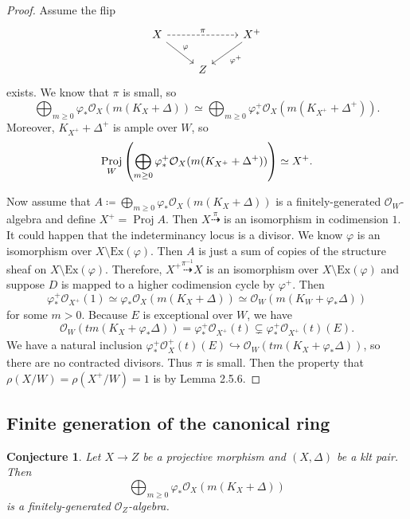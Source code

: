 \documentclass[leqno, openany]{memoir}
\newtheorem{conj}[thm]{Conjecture}
\theoremstyle{definition}
\theoremstyle{remark}
\theoremstyle{plain}
\theoremstyle{definition}
\theoremstyle{remark}
\newcommand{\mc}[1]{\mathcal{#1}}
\newcommand{\mr}[1]{\mathrm{#1}}
\DeclareMathOperator{\Proj}{Proj}
\begin{document}
\begin{proof}
    Assume the flip
    \begin{equation*}
    \begin{tikzcd}
        X \ar[dashrightarrow]{rr}{\pi} \ar{dr}{\varphi} & & X^+ \ar{dl}{\varphi^+} \\
                                                        & Z
    \end{tikzcd}
    \end{equation*}
    exists. We know that $\pi$ is small, so
    \[ \bigoplus_{m \geq 0} \varphi_* \mc{O}_X(m(K_X + \Delta)) \simeq \bigoplus_{m \geq 0} \varphi^+_* \mc{O}_X(m(K_{X^+} + \Delta^+)). \]
    Moreover, $K_{X^+} + \Delta^+$ is ample over $W$, so 
    \[ \Proj_W \qty(\bigoplus_{m \geq 0} \varphi^+_* \mc{O}_X(m(K_{X^+} + \Delta^+))) \simeq X^+. \]

    Now assume that $A \coloneqq \bigoplus_{m \geq 0} \varphi_* \mc{O}_X(m(K_X + \Delta))$ is a finitely-generated $\mc{O}_W$-algebra and define $X^+ = \Proj A$. Then $X \overset{\pi}{\dashrightarrow}$ is an isomorphism in codimension $1$. It could happen that the indeterminancy locus is a divisor. We know $\varphi$ is an isomorphism over $X \setminus \mr{Ex}(\varphi)$. Then $A$ is just a sum of copies of the structure sheaf on $X \setminus \mr{Ex}(\varphi)$. Therefore, $X^+ \overset{\pi^{-1}}{\dashrightarrow} X$ is an isomorphism over $X \setminus \mr{Ex}(\varphi)$ and suppose $D$ is mapped to a higher codimension cycle by $\varphi^+$. Then
    \[ \varphi_*^+ \mc{O}_{X^+}(1) \simeq \varphi_* \mc{O}_X(m(K_X + \Delta)) \simeq \mc{O}_W(m(K_W + \varphi_* \Delta)) \]
    for some $m > 0$. Because $E$ is exceptional over $W$, we have 
    \[ \mc{O}_W(tm(K_X + \varphi_* \Delta)) = \varphi_*^+ \mc{O}_{X^+}(t) \subsetneq \varphi_*^+ \mc{O}_{X^+}(t)(E). \]
    We have a natural inclusion $\varphi_*^+ \mc{O}_X^+(t)(E) \hookrightarrow \mc{O}_W(tm(K_X + \varphi_* \Delta))$, so there are no contracted divisors. Thus $\pi$ is small. Then the property that $\rho(X/W) = \rho(X^+/W) = 1$ is by Lemma 2.5.6.
\end{proof}

\subsection{Finite generation of the canonical ring}%
\label{sub:finite_generation_of_the_canonical_ring}

\begin{conj}
    Let $X \to Z$ be a projective morphism and $(X, \Delta)$ be a klt pair. Then
    \[ \bigoplus_{m \geq 0} \varphi_* \mc{O}_X(m(K_X + \Delta)) \]
    is a finitely-generated $\mc{O}_Z$-algebra.
\end{conj}
\end{document}
